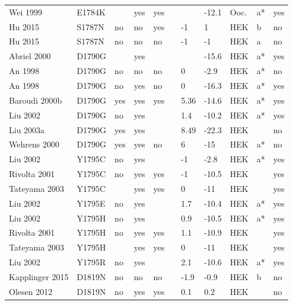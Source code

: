 \begin{tiny}
\begin{longtable}{p{4cm}|l|llll|ll|lll}
Wei 1999\cite{Wei1999MutationDB} & E1784K &  & yes & yes &  &  & -12.1 & Ooc. & a* & yes \\
Hu 2015\cite{Hu2015MutationDB} & S1787N & no & no & yes &  & -1 & 1 & HEK & b & no \\
Hu 2015\cite{Hu2015MutationDB} & S1787N & no & no & no &  & -1 & -1 & HEK & a & no \\
Abriel 2000\cite{Abriel2000MutationDB} & D1790G &  & yes &  &  &  & -15.6 & HEK & a* & yes \\
An 1998\cite{An1998MutationDB} & D1790G & no & no & no &  & 0 & -2.9 & HEK & a* & no \\
An 1998\cite{An1998MutationDB} & D1790G & no & yes & no &  & 0 & -16.3 & HEK & a* & yes \\
Baroudi 2000b\cite{Baroudi2000bMutationDB} & D1790G & yes & yes & yes &  & 5.36 & -14.6 & HEK & a* & yes \\
Liu 2002\cite{Liu2002MutationDB} & D1790G & no & yes &  &  & 1.4 & -10.2 & HEK & a* & yes \\
Liu 2003a\cite{Liu2003aMutationDB} & D1790G & yes & yes &  &  & 8.49 & -22.3 & HEK &  & no \\
Wehrens 2000\cite{Wehrens2000MutationDB} & D1790G & yes & yes & no &  & 6 & -15 & HEK & a* & no \\
Liu 2002\cite{Liu2002MutationDB} & Y1795C & no & yes &  &  & -1 & -2.8 & HEK & a* & yes \\
Rivolta 2001\cite{Rivolta2001MutationDB} & Y1795C & no & yes & yes &  & -1 & -10.5 & HEK &  & yes \\
Tateyama 2003\cite{Tateyama2003MutationDB} & Y1795C &  & yes & yes &  & 0 & -11 & HEK &  & yes \\
Liu 2002\cite{Liu2002MutationDB} & Y1795E & no & yes &  &  & 1.7 & -10.4 & HEK & a* & yes \\
Liu 2002\cite{Liu2002MutationDB} & Y1795H & no & yes &  &  & 0.9 & -10.5 & HEK & a* & yes \\
Rivolta 2001\cite{Rivolta2001MutationDB} & Y1795H & no & yes & yes &  & 1.1 & -10.9 & HEK &  & yes \\
Tateyama 2003\cite{Tateyama2003MutationDB} & Y1795H &  & yes & yes &  & 0 & -11 & HEK &  & yes \\
Liu 2002\cite{Liu2002MutationDB} & Y1795R & no & yes &  &  & 2.1 & -10.6 & HEK & a* & yes \\
Kapplinger 2015\cite{Kapplinger2015MutationDB} & D1819N & no & no & no &  & -1.9 & -0.9 & HEK & b & no \\
Olesen 2012\cite{Olesen2012MutationDB} & D1819N & no & yes & yes &  & 0.1 & 0.2 & HEK &  & no \\

\end{longtable}
\end{tiny}
